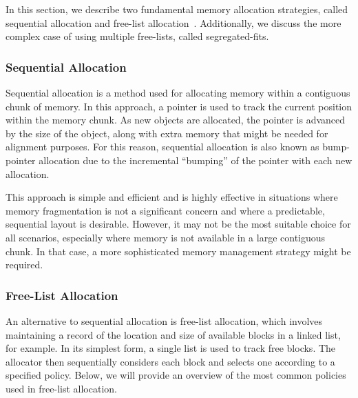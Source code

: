
In this section, we describe two fundamental memory allocation strategies, called sequential allocation and free-list allocation~\cite{gchandbook}. Additionally, we discuss the more complex case of using multiple free-lists, called segregated-fits.

\subsubsection{Sequential Allocation}
\label{sec:seq_allocation}
\label{sec:bump_pointer}

Sequential allocation is a method used for allocating memory within a contiguous chunk of memory. In this approach, a pointer is used to track the current position within the memory chunk. As new objects are allocated, the pointer is advanced by the size of the object, along with extra memory that might be needed for alignment purposes. For this reason, sequential allocation is also known as bump-pointer allocation due to the incremental ``bumping'' of the pointer with each new allocation. 

This approach is simple and efficient and is highly effective in situations where memory fragmentation is not a significant concern and where a predictable, sequential layout is desirable. However, it may not be the most suitable choice for all scenarios, especially where memory is not available in a large contiguous chunk. In that case, a more sophisticated memory management strategy might be required. 

\subsubsection{Free-List Allocation}

An alternative to sequential allocation is free-list allocation, which involves maintaining a record of the location and size of available blocks in a linked list, for example. In its simplest form, a single list is used to track free blocks. The allocator then sequentially considers each block and selects one according to a specified policy. Below, we will provide an overview of the most common policies used in free-list allocation.

